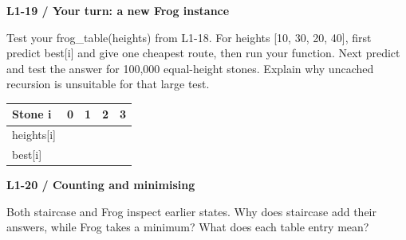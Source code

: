 \documentclass[11pt,a4paper]{article}
\begin{document}
\par\noindent\begin{minipage}{\linewidth}
\textbf{L1-19 / Your turn: a new Frog instance}\par\smallskip Test your frog\_table(heights) from L1-18. For heights [10, 30, 20, 40], first predict best[i] and give one cheapest route, then run your function. Next predict and test the answer for 100,000 equal-height stones. Explain why uncached recursion is unsuitable for that large test.\par
\par\smallskip \begingroup\small\setlength{\tabcolsep}{4pt}\renewcommand{\arraystretch}{1.35}\begin{tabularx}{\linewidth}{>{\raggedright\arraybackslash}X>{\raggedright\arraybackslash}X>{\raggedright\arraybackslash}X>{\raggedright\arraybackslash}X>{\raggedright\arraybackslash}X}\toprule\textbf{Stone i} & \textbf{0} & \textbf{1} & \textbf{2} & \textbf{3}\\\midrule
heights[i] & 10 & 30 & 20 & 40\\
best[i] & 0 &  &  & \\
\bottomrule\end{tabularx}\endgroup\par\smallskip 
\end{minipage}\par\vspace{2mm}
\par\noindent\begin{minipage}{\linewidth}
\textbf{L1-20 / Counting and minimising}\par\smallskip Both staircase and Frog inspect earlier states. Why does staircase add their answers, while Frog takes a minimum? What does each table entry mean?\par
\end{minipage}\par\vspace{2mm}
\end{document}
